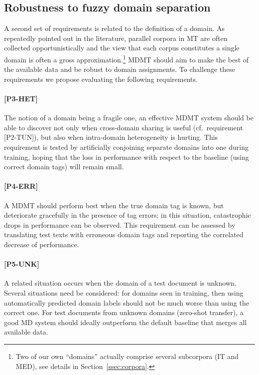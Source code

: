 \documentclass[11pt,a4paper]{article}
\newcommand{\fyTodo}[1]{\Todo[FY:]{\textcolor{orange}{#1}}}
\newcommand{\fyDone}[1]{\done[FY]\Todo[FY:]{\textcolor{orange}{#1}}}
\newcommand{\jcDone}[1]{\done[JC]\Todo[JC:]{\textcolor{red}{#1}}}
\begin{document}
\subsection{Robustness to fuzzy domain separation \label{ssec:robusness}}
A second set of requirements is related to the definition of a domain. As repeatedly pointed out in the literature, parallel corpora in MT are often collected opportunistically and the view that each corpus constitutes a single domain is often a gross approximation.\footnote{Two of our own ``domains'' actually comprise several subcorpora (IT and MED), see details in Section~\ref{ssec:corpora}.} MDMT should aim to make the best of the available data and be robust to domain assignments. To challenge these requirements we propose evaluating the following requirements.

\paragraph{[P3-HET]}
The notion of a domain being a fragile one, an effective MDMT system should be able to discover not only when cross-domain sharing is useful (cf.\ requirement [P2-TUN])\jcDone{what is P2.2?}, but also when intra-domain heterogeneity is hurting. This requirement is tested by artificially conjoining separate domains into one during training, hoping that the loss in performance with respect to the baseline (using correct domain tags) will remain small.

\paragraph{[P4-ERR]}
A MDMT should perform best when the true domain tag is known, but deteriorate gracefully in the presence of tag errors; in this situation, catastrophic drops in performance can be observed\fyDone{cite \cite{McCloskey89catastrophic}}. This requirement can be assessed by translating test texts with erroneous domain tags and reporting the correlated decrease of performance.

\paragraph{[P5-UNK]}
A related situation occurs when the domain of a test document is unknown. Several situations need be considered: for domains seen in training, then using automatically predicted domain labels should not be much worse than using the correct one. For test documents from unknown domains (zero-shot transfer), a good MD system should ideally outperform the default baseline that merges all available data.\fyDone{Systems react to unknown domains}
\end{document}
